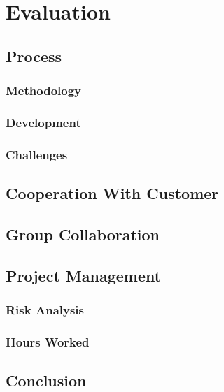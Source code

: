 
\chapter{Evaluation}

\section{Process}
\subsection{Methodology}
\subsection{Development}
\subsection{Challenges}

\section{Cooperation With Customer}

\section{Group Collaboration}

\section{Project Management}
\subsection{Risk Analysis}
\label{updated_risk_analysis}

\subsection{Hours Worked}

\section{Conclusion}


\cleardoublepage